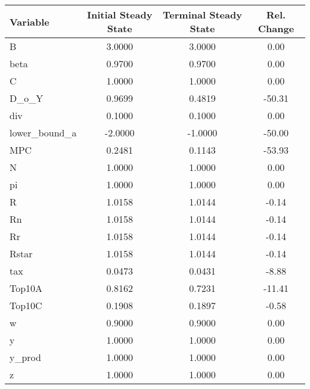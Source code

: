 \documentclass[12pt]{article}
\numberwithin{equation}{section} %
\begin{document}
\begin{center}
\begin{tabular}{lccc}
     Variable &  Initial Steady State &  Terminal Steady State &  Rel. Change \\
     \hline
            B &                3.0000 &                 3.0000 &         0.00 \\
         beta &                0.9700 &                 0.9700 &         0.00 \\
            C &                1.0000 &                 1.0000 &         0.00 \\
        D\_o\_Y &                0.9699 &                 0.4819 &       -50.31 \\
          div &                0.1000 &                 0.1000 &         0.00 \\
lower\_bound\_a &               -2.0000 &                -1.0000 &       -50.00 \\
          MPC &                0.2481 &                 0.1143 &       -53.93 \\
            N &                1.0000 &                 1.0000 &         0.00 \\
           pi &                1.0000 &                 1.0000 &         0.00 \\
            R &                1.0158 &                 1.0144 &        -0.14 \\
           Rn &                1.0158 &                 1.0144 &        -0.14 \\
           Rr &                1.0158 &                 1.0144 &        -0.14 \\
        Rstar &                1.0158 &                 1.0144 &        -0.14 \\
          tax &                0.0473 &                 0.0431 &        -8.88 \\
       Top10A &                0.8162 &                 0.7231 &       -11.41 \\
       Top10C &                0.1908 &                 0.1897 &        -0.58 \\
            w &                0.9000 &                 0.9000 &         0.00 \\
            y &                1.0000 &                 1.0000 &         0.00 \\
       y\_prod &                1.0000 &                 1.0000 &         0.00 \\
            z &                1.0000 &                 1.0000 &         0.00 \\
\end{tabular}
\end{center}
\end{document}
